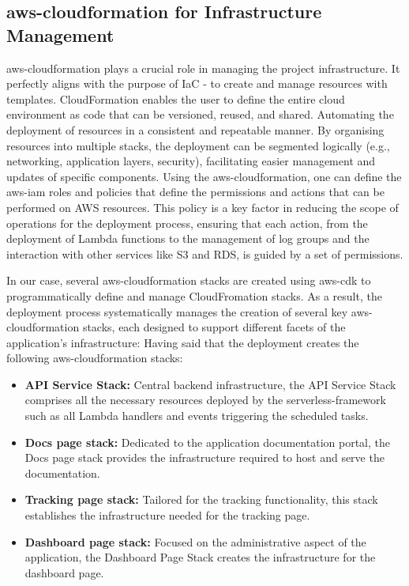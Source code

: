 \subsection{\gls{aws-cloudformation} for Infrastructure Management}
\label{subsec:aws-cloudformation-infrastructure}

\gls{aws-cloudformation} plays a crucial role in managing the project infrastructure.
It perfectly aligns with the purpose of \ac{IaC} - to create and manage resources with templates.
CloudFormation enables the user to define the entire cloud environment as code that can be versioned, reused, and shared. 
Automating the deployment of resources in a consistent and repeatable manner.
By organising resources into multiple stacks, the deployment can be segmented logically (e.g., networking, application layers, security), facilitating easier management and updates of specific components.
Using the \gls{aws-cloudformation}, one can define the \gls{aws-iam} roles and policies that define the permissions and actions that can be performed on \ac{AWS} resources.
This policy is a key factor in reducing the scope of operations for the deployment process, ensuring that each action, from the deployment of Lambda functions to the management of log groups and the interaction with other services like \ac{S3} and \ac{RDS}, is guided by a set of permissions. 

In our case, several \gls{aws-cloudformation} stacks are created using \gls{aws-cdk} to programmatically define and manage CloudFromation stacks.
As a result, the deployment process systematically manages the creation of several key \gls{aws-cloudformation} stacks, each designed to support different facets of the application's infrastructure:
Having said that the deployment creates the following \gls{aws-cloudformation} stacks:
\begin{itemize}
    \item \textbf{API Service Stack:} Central backend infrastructure, the API Service Stack comprises all the necessary resources deployed by the \gls{serverless-framework} such as all Lambda handlers and events triggering the scheduled tasks.
    \item \textbf{Docs page stack:} Dedicated to the application documentation portal, the Docs page stack provides the infrastructure required to host and serve the documentation. 
    \item \textbf{Tracking page stack:} Tailored for the tracking functionality, this stack establishes the infrastructure needed for the tracking page.
    \item \textbf{Dashboard page stack:}  Focused on the administrative aspect of the application, the Dashboard Page Stack creates the infrastructure for the dashboard page. 
\end{itemize}

